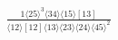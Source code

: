 \documentclass[varwidth, border=5pt]{standalone}
\begin{document}
\begin{my}
$\begin{gathered}
\scriptscriptstyle\frac{1⟨25⟩^3⟨34⟩⟨15⟩[13]}{⟨12⟩[12]⟨13⟩⟨23⟩⟨24⟩⟨45⟩^2}
\end{gathered}$
\end{my}
\end{document}
